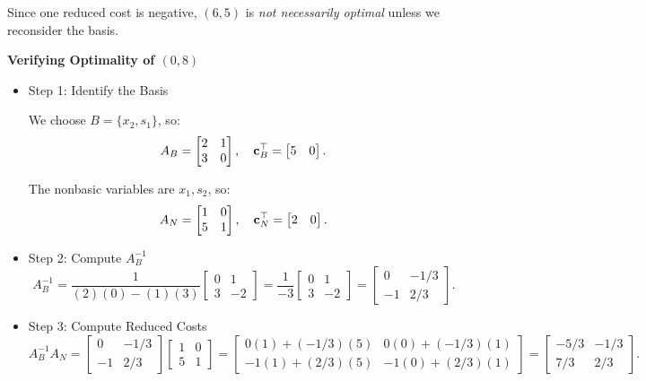 \begin{solution}
\begin{itemize}
Since one reduced cost is negative, \( (6,5) \) is \emph{not necessarily optimal} unless we reconsider the basis.
\end{itemize}

\textbf{Verifying Optimality of \( (0,8) \)}

\begin{itemize}
\item {Step 1: Identify the Basis}

We choose \(B= \{x_2, s_1\} \), so:
\[
A_B =
\begin{bmatrix}
    2 & 1 \\
    3 & 0
\end{bmatrix}, \quad
\mathbf{c}_B^\top =
\begin{bmatrix}
    5 & 0
\end{bmatrix}.
\]

The nonbasic variables are \( x_1, s_2 \), so:
\[
A_N =
\begin{bmatrix}
    1 & 0 \\
    5 & 1
\end{bmatrix}, \quad
\mathbf{c}_N^\top =
\begin{bmatrix}
    2 & 0
\end{bmatrix}.
\]

\item {Step 2: Compute \( A_B^{-1} \)}
\[
A_B^{-1} =
\frac{1}{(2)(0) - (1)(3)}
\begin{bmatrix}
    0 & 1 \\
    3 & -2
\end{bmatrix}
=
\frac{1}{-3}
\begin{bmatrix}
    0 & 1 \\
    3 & -2
\end{bmatrix}
=
\begin{bmatrix}
    0 & -1/3 \\
    -1 & 2/3
\end{bmatrix}.
\]


\item {Step 3: Compute Reduced Costs}
\[
A_B^{-1} A_N =
\begin{bmatrix}
    0 & -1/3 \\
    -1 & 2/3
\end{bmatrix}
\begin{bmatrix}
    1 & 0 \\
    5 & 1
\end{bmatrix}
=
\begin{bmatrix}
    0(1) + (-1/3)(5) & 0(0) + (-1/3)(1) \\
    -1(1) + (2/3)(5) & -1(0) + (2/3)(1)
\end{bmatrix}
=
\begin{bmatrix}
    -5/3 & -1/3 \\
    7/3 & 2/3
\end{bmatrix}.
\]


\end{itemize}
\end{solution}
